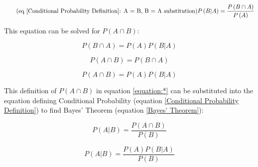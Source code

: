 \documentclass{article}
\begin{document}


\begin{equation} \tag{eq \ref{Conditional Probability Definition}: A = B, B = A substitution}
		\nonumber P \left( B | A \right) = \frac{ P  \left( B \cap A \right)}{P \left( A \right)}
\end{equation} 


This equation can be solved for $P  \left( A \cap B \right) $:

\begin{equation} 
		\nonumber P  \left( B \cap A \right)  =  P  \left( A \right) P \left( B | A \right)
\end{equation} 

\begin{equation} 
		\nonumber P  \left( A \cap B \right)  =  \nonumber P  \left( B \cap A \right) 
\end{equation} 

\begin{equation} \tag{*}
		\nonumber P  \left( A \cap B \right)  =  P  \left( A \right) P \left( B | A \right)
		\label{equation:*}
\end{equation} 

This definition of $P  \left( A \cap B \right)$ in equation \ref{equation:*} can be substituted into the equation defining Conditional Probability (equation \ref{Conditional Probability Definition}) to find Bayes' Theorem (equation \ref{Bayes' Theorem}):

\begin{equation} \tag{1}
		\nonumber P \left( A | B \right) = \frac{ P  \left( A \cap B \right)}{P \left( B \right)}
\end{equation} 

\begin{equation} \tag{2}
		\nonumber P \left( A | B \right) = \frac{ P  \left( A  \right) P \left( B | A \right)}{P \left( B \right)}
\end{equation} \\
\end{document}
